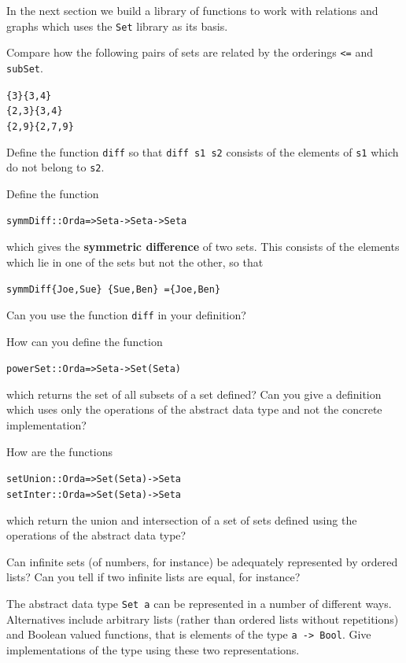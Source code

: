 \medskip\noindent 
In the next section we build a library of functions to work with relations and
graphs which uses the \texttt{Set} library as its basis.

\begin{exercises}

\item
Compare how the following pairs of sets are related by the orderings
\texttt{<=} and \texttt{subSet}.
\begin{alltt}
\{3\}          \{3,4\}
\{2,3\}        \{3,4\}
\{2,9\}        \{2,7,9\}
\end{alltt}

\item
Define the function \texttt{diff} so that \texttt{diff s1 s2} consists of the 
elements of \texttt{s1} which do not belong to \texttt{s2}.  

\item
Define the function
\begin{alltt}
symmDiff :: Ord a => Set a -> Set a -> Set a
\end{alltt}
which gives the \textbf{symmetric difference} of two sets. This consists of the
elements which lie in one of the sets but not the other, so that
\begin{alltt}
symmDiff \{Joe,Sue\}\ \{Sue,Ben\}\ =  \{Joe,Ben\}
\end{alltt}
Can you use the function \texttt{diff} in your definition?

\item
How can you define the
function
\begin{alltt}
powerSet :: Ord a => Set a -> Set (Set a)
\end{alltt}
which returns the set of all
subsets of a set defined? Can you give a definition which uses only the
operations of the abstract data type and not the concrete implementation?

\item
How are the
functions
\begin{alltt}
setUnion :: Ord a => Set (Set a) -> Set a
setInter :: Ord a => Set (Set a) -> Set a
\end{alltt}
which return the union and intersection
of a set of sets defined using the operations of the abstract data type?

\item
Can infinite sets (of numbers, for instance) be adequately
represented by ordered lists? Can you tell if two infinite lists are equal,
for instance?

\item
The abstract data type \texttt{Set a} can be represented in a number of different ways.
Alternatives include  arbitrary lists (rather than ordered lists without
repetitions) and Boolean valued functions, that is elements of the type 
\texttt{a -> Bool}. Give implementations of the type using these two representations.


\end{exercises}
